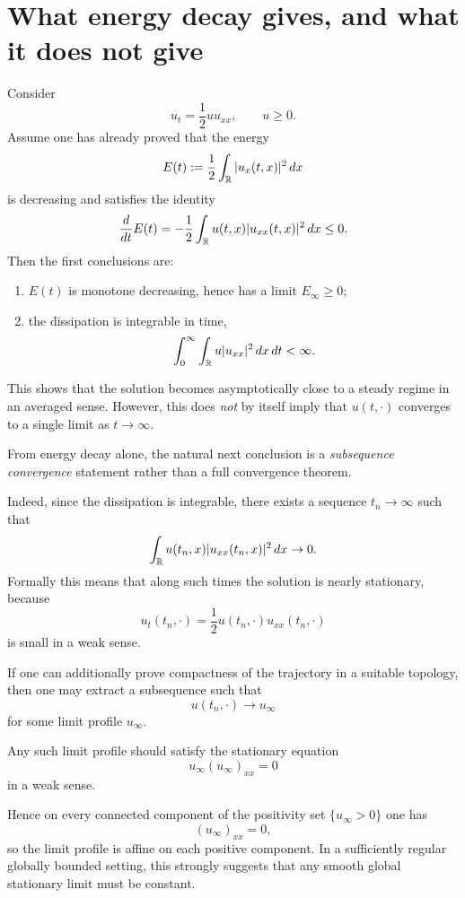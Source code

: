 \section{What energy decay gives, and what it does not give}

Consider
\[
    u_t = \frac12 u u_{xx}, \qquad u\ge 0.
\]
Assume one has already proved that the energy
\[
    E(t):=\frac12\int_{\mathbb R}|u_x(t,x)|^2\,dx
\]
is decreasing and satisfies the identity
\[
    \frac{d}{dt}E(t)= -\frac12\int_{\mathbb R} u(t,x)|u_{xx}(t,x)|^2\,dx \le 0.
\]
Then the first conclusions are:
\begin{enumerate}[leftmargin=2em]
    \item $E(t)$ is monotone decreasing, hence has a limit $E_\infty\ge 0$;
    \item the dissipation is integrable in time,
    \[
        \int_0^{\infty}\int_{\mathbb R} u|u_{xx}|^2\,dx\,dt < \infty.
    \]
\end{enumerate}

This shows that the solution becomes asymptotically close to a steady regime in an averaged sense. However, this does \emph{not} by itself imply that $u(t,\cdot)$ converges to a single limit as $t\to\infty$.

\begin{proposition}
From energy decay alone, the natural next conclusion is a \emph{subsequence convergence} statement rather than a full convergence theorem.
\end{proposition}

Indeed, since the dissipation is integrable, there exists a sequence $t_n\to\infty$ such that
\[
    \int_{\mathbb R} u(t_n,x)|u_{xx}(t_n,x)|^2\,dx \to 0.
\]
Formally this means that along such times the solution is nearly stationary, because
\[
    u_t(t_n,\cdot)=\frac12 u(t_n,\cdot)u_{xx}(t_n,\cdot)
\]
is small in a weak sense.

If one can additionally prove compactness of the trajectory in a suitable topology, then one may extract a subsequence such that
\[
    u(t_n,\cdot) \to u_\infty
\]
for some limit profile $u_\infty$.

\begin{proposition}
Any such limit profile should satisfy the stationary equation
\[
    u_\infty (u_\infty)_{xx}=0
\]
in a weak sense.
\end{proposition}

Hence on every connected component of the positivity set $\{u_\infty>0\}$ one has
\[
    (u_\infty)_{xx}=0,
\]
so the limit profile is affine on each positive component. In a sufficiently regular globally bounded setting, this strongly suggests that any smooth global stationary limit must be constant.

